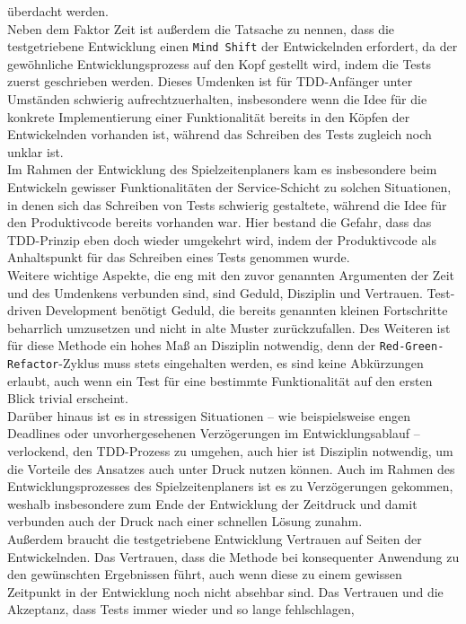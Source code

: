 überdacht werden. \\ 
Neben dem Faktor Zeit ist außerdem die Tatsache zu nennen, dass die testgetriebene 
Entwicklung einen \texttt{Mind Shift} der Entwickelnden erfordert, da der gewöhnliche 
Entwicklungsprozess auf den Kopf gestellt wird, indem die Tests zuerst geschrieben 
werden. Dieses Umdenken ist für TDD-Anfänger unter Umständen schwierig 
aufrechtzuerhalten, insbesondere wenn die Idee für die konkrete Implementierung einer 
Funktionalität bereits in den Köpfen der Entwickelnden vorhanden ist, während das 
Schreiben des Tests zugleich noch unklar ist. \\ 
Im Rahmen der Entwicklung des Spielzeitenplaners kam es insbesondere beim 
Entwickeln gewisser Funktionalitäten der Service-Schicht zu solchen Situationen, in denen 
sich das Schreiben von Tests schwierig gestaltete, während die Idee für den Produktivcode 
bereits vorhanden war. Hier bestand die Gefahr, dass das TDD-Prinzip eben doch wieder 
umgekehrt wird, indem der Produktivcode als Anhaltspunkt für das Schreiben eines Tests 
genommen wurde. \\ 
Weitere wichtige Aspekte, die eng mit den zuvor genannten Argumenten der Zeit und 
des Umdenkens verbunden sind, sind Geduld, Disziplin und Vertrauen. 
Test-driven Development benötigt Geduld, die bereits genannten kleinen Fortschritte 
beharrlich umzusetzen und nicht in alte Muster zurückzufallen. Des Weiteren ist für diese 
Methode ein hohes Maß an Disziplin notwendig, denn der \texttt{Red-Green-Refactor}-Zyklus 
muss stets eingehalten werden, es sind keine Abkürzungen erlaubt, auch wenn ein Test für 
eine bestimmte Funktionalität auf den ersten Blick trivial erscheint. \\ 
Darüber hinaus ist es in stressigen Situationen -- wie beispielsweise engen Deadlines 
oder unvorhergesehenen Verzögerungen im Entwicklungsablauf -- verlockend, den TDD-Prozess 
zu umgehen, auch hier ist Disziplin notwendig, um die Vorteile des Ansatzes auch unter 
Druck nutzen können. Auch im Rahmen des Entwicklungsprozesses des Spielzeitenplaners ist 
es zu Verzögerungen gekommen, weshalb insbesondere zum Ende der Entwicklung der 
Zeitdruck und damit verbunden auch der Druck nach einer schnellen Lösung zunahm. \\ 
Außerdem braucht die testgetriebene Entwicklung Vertrauen auf Seiten der Entwickelnden. 
Das Vertrauen, dass die Methode bei konsequenter Anwendung zu den gewünschten Ergebnissen 
führt, auch wenn diese zu einem gewissen Zeitpunkt in der Entwicklung noch nicht absehbar 
sind. Das Vertrauen und die Akzeptanz, dass Tests immer wieder und so lange fehlschlagen, 
